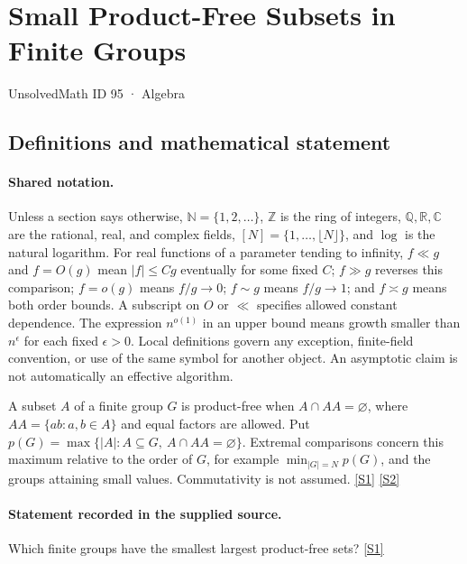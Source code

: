 \documentclass[11pt,a4paper]{article}
\newcommand{\N}{\mathbb{N}}
\newcommand{\Z}{\mathbb{Z}}
\newcommand{\Q}{\mathbb{Q}}
\newcommand{\R}{\mathbb{R}}
\newcommand{\C}{\mathbb{C}}
\newcommand{\sref}[2]{\hyperlink{source:#1:#2}{[S#2]}}
\begin{document}

\setcounter{section}{94}

\section{Small Product-Free Subsets in Finite Groups}\label{95}

{\small\sffamily UnsolvedMath ID 95 · Algebra}

\subsection{Definitions and mathematical statement}

\paragraph{Shared notation.}Unless a section says otherwise, $\N=\{1,2,\ldots\}$,
$\Z$ is the ring of integers, $\Q,\R,\C$ are the rational, real, and complex
fields, $[N]=\{1,\ldots,\lfloor N\rfloor\}$, and $\log$ is the natural
logarithm. For real functions of a parameter tending to infinity,
$f\ll g$ and $f=O(g)$ mean $|f|\leq Cg$ eventually for some fixed $C$;
$f\gg g$ reverses this comparison; $f=o(g)$ means $f/g\to0$;
$f\sim g$ means $f/g\to1$; and $f\asymp g$ means both order bounds.
A subscript on $O$ or $\ll$ specifies allowed constant dependence.
The expression $n^{o(1)}$ in an upper bound means growth smaller than
$n^\epsilon$ for each fixed $\epsilon>0$. Local definitions govern any
exception, finite-field convention, or use of the same symbol for another
object. An asymptotic claim is not automatically an effective algorithm.



A subset $A$ of a finite group $G$ is product-free when $A\cap AA=\varnothing$, where $AA=\{ab:a,b\in A\}$ and equal factors are allowed. Put $p(G)=\max\{|A|:A\subseteq G,\ A\cap AA=\varnothing\}$. Extremal comparisons concern this maximum relative to the order of $G$, for example $\min_{|G|=N}p(G)$, and the groups attaining small values. Commutativity is not assumed. \sref{95}{1} \sref{95}{2}

\paragraph{Statement recorded in the supplied source.}
Which finite groups have the smallest largest product-free sets? \sref{95}{1}
\end{document}
